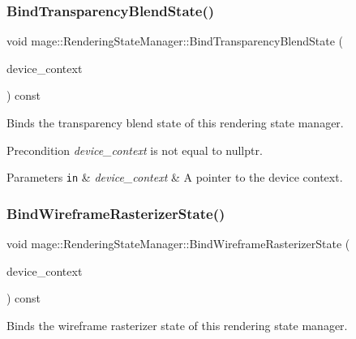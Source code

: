 \subsubsection{\texorpdfstring{Bind\+Transparency\+Blend\+State()}{BindTransparencyBlendState()}}
{\footnotesize\ttfamily void mage\+::\+Rendering\+State\+Manager\+::\+Bind\+Transparency\+Blend\+State (\begin{DoxyParamCaption}\item[{I\+D3\+D11\+Device\+Context2 $\ast$}]{device\+\_\+context }\end{DoxyParamCaption}) const\hspace{0.3cm}{\ttfamily [noexcept]}}

Binds the transparency blend state of this rendering state manager.

\begin{DoxyPrecond}{Precondition}
{\itshape device\+\_\+context} is not equal to {\ttfamily nullptr}. 
\end{DoxyPrecond}

\begin{DoxyParams}[1]{Parameters}
\mbox{\tt in}  & {\em device\+\_\+context} & A pointer to the device context. \\
\hline
\end{DoxyParams}
\hypertarget{classmage_1_1_rendering_state_manager_a385628cb8e03d0364ae8c6495268db75}{}\label{classmage_1_1_rendering_state_manager_a385628cb8e03d0364ae8c6495268db75} 
\subsubsection{\texorpdfstring{Bind\+Wireframe\+Rasterizer\+State()}{BindWireframeRasterizerState()}}
{\footnotesize\ttfamily void mage\+::\+Rendering\+State\+Manager\+::\+Bind\+Wireframe\+Rasterizer\+State (\begin{DoxyParamCaption}\item[{I\+D3\+D11\+Device\+Context2 $\ast$}]{device\+\_\+context }\end{DoxyParamCaption}) const\hspace{0.3cm}{\ttfamily [noexcept]}}

Binds the wireframe rasterizer state of this rendering state manager.

